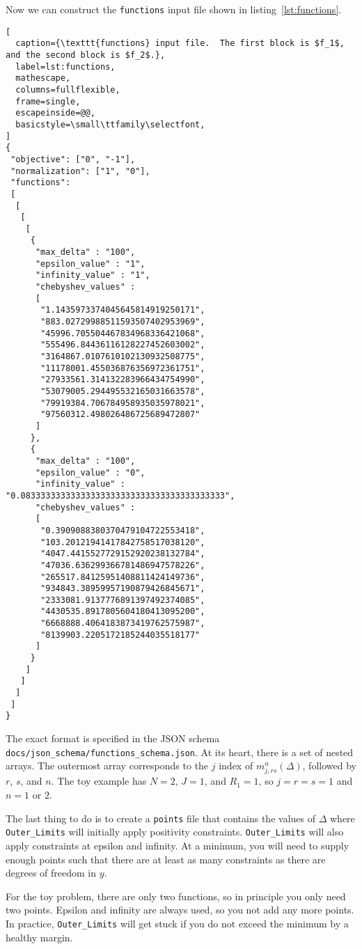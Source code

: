 \documentclass[12pt]{article}
\numberwithin{equation}{section}
\begin{document}
Now we can construct the \texttt{functions} input file shown in
listing~\ref{lst:functions}.

\begin{lstlisting}[
  caption={\texttt{functions} input file.  The first block is $f_1$, and the second block is $f_2$.},
  label=lst:functions,
  mathescape,
  columns=fullflexible,
  frame=single,
  escapeinside=@@,
  basicstyle=\small\ttfamily\selectfont,
]
{
 "objective": ["0", "-1"],
 "normalization": ["1", "0"],
 "functions":
 [
  [
   [
    [
     {
      "max_delta" : "100",
      "epsilon_value" : "1",
      "infinity_value" : "1",
      "chebyshev_values" :
      [
       "1.1435973374045645814919250171",
       "883.02729988511593507402953969",
       "45996.705504467834968336421068",
       "555496.84436116128227452603002",
       "3164867.0107610102130932508775",
       "11178001.455036876356972361751",
       "27933561.314132283966434754990",
       "53079005.294495532165031663578",
       "79919384.706784958935035978021",
       "97560312.498026486725689472807"
      ]
     },
     {
      "max_delta" : "100",
      "epsilon_value" : "0",
      "infinity_value" : "0.08333333333333333333333333333333333333333",
      "chebyshev_values" :
      [
       "0.3909088380370479104722553418",
       "103.20121941417842758517038120",
       "4047.4415527729152920238132784",
       "47036.636299366781486947578226",
       "265517.84125951408811424149736",
       "934843.38959957190879426845671",
       "2333081.9137776891397492374085",
       "4430535.8917805604180413095200",
       "6668888.4064183873419762575987",
       "8139903.2205172185244035518177"
      ]
     }
    ]
   ]
  ]
 ]
}
\end{lstlisting}

The exact format is specified in the JSON schema
\texttt{docs/json_schema/functions\_schema.json}. At its heart, there is a set of
nested arrays.  The outermost array corresponds to the $j$ index of
$m_{j,rs}^{n}(\Delta)$, followed by $r$, $s$, and $n$.  The toy
example has $N=2$, $J=1$, and $R_{1}=1$, so $j=r=s=1$ and $n=1$ or
$2$.

The last thing to do is to create a \texttt{points} file that contains
the values of $\Delta$ where \texttt{Outer\_Limits} will initially
apply positivity constraints.  \texttt{Outer\_Limits} will also apply
constraints at epsilon and infinity.  At a minimum, you will need to supply enough
points such that there are at least as many constraints as there are
degrees of freedom in $y$.

For the toy problem, there are only two functions, so in principle you
only need two points.  Epsilon and infinity are always used, so you
not add any more points.  In practice, \texttt{Outer\_Limits} will get stuck if
you do not exceed the minimum by a healthy margin.
\end{document}
